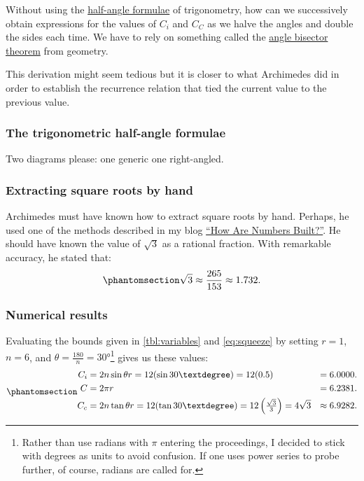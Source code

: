 \documentclass[
  a4paper,
]{article}
\begin{document}
Without using the
\href{https://math.libretexts.org/Bookshelves/Algebra/Algebra_and_Trigonometry_1e_(OpenStax)/09:_Trigonometric_Identities_and_Equations/9.03:_Double-Angle_Half-Angle_and_Reduction_Formulas}{half-angle
formulae} of trigonometry, how can we successively obtain expressions
for the values of \(C_i\) and \(C_C\) as we halve the angles and double
the sides each time. We have to rely on something called the
\href{https://en.wikipedia.org/wiki/Angle_bisector_theorem}{angle
bisector theorem} from geometry.

This derivation might seem tedious but it is closer to what Archimedes
did in order to establish the recurrence relation that tied the current
value to the previous value.

\subsubsection{The trigonometric half-angle
formulae}\label{the-trigonometric-half-angle-formulae}

Two diagrams please: one generic one right-angled.

\subsubsection{Extracting square roots by
hand}\label{extracting-square-roots-by-hand}

Archimedes must have known how to extract square roots by hand. Perhaps,
he used one of the methods described in my blog
\href{https://swanlotus.netlify.app/blogs/how-are-numbers-built}{``How
Are Numbers Built?''}. He should have known the value of \(\sqrt{3}\) as
a rational fraction. With remarkable accuracy, he stated that:
\begin{equation}\phantomsection\label{eq:sqrt3}{\sqrt{3} \approx \frac{265}{153} \approx 1.732.
}\end{equation}

\subsubsection{Numerical results}\label{numerical-results}

Evaluating the bounds given in \cref{tbl:variables} and
\cref{eq:squeeze} by setting \(r = 1\), \(n = 6\), and
\(\theta = \frac{180}{n} = 30°\)\footnote{Rather than use radians with
  \(\pi\) entering the proceedings, I decided to stick with degrees as
  units to avoid confusion. If one uses power series to probe further,
  of course, radians are called for.} gives us these values:
\begin{equation}\phantomsection\label{eq:triple-6}{
\begin{aligned}
C_i &= 2n\sin\theta r = 12(\sin 30°) = 12(0.5) &= 6.0000.\\
C &= 2\pi r &= 6.2381.\\
C_c &= 2n\tan\theta r = 12(\tan 30°) = 12\left(\tfrac{\sqrt{3}}{3}\right) = 4\sqrt{3} &\approx 6.9282.\\
\end{aligned}
}\end{equation}
\end{document}
